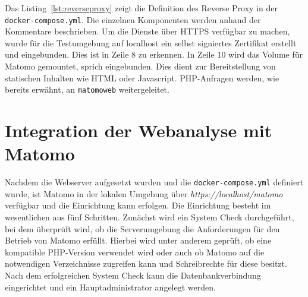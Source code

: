 Das Listing~\ref{lst:reverseproxy} zeigt die Definition des Reverse Proxy in der \texttt{docker-compose.yml}. Die einzelnen Komponenten werden anhand der Kommentare beschrieben. Um die Dienste über HTTPS verfügbar zu machen, wurde für die Testumgebung auf localhost ein selbst signiertes Zertifikat erstellt und eingebunden. Dies ist in Zeile 8 zu erkennen. In Zeile 10 wird das Volume für Matomo gemountet, sprich eingebunden. Dies dient zur Bereitstellung von statischen Inhalten wie HTML oder Javascript. PHP-Anfragen werden, wie bereits erwähnt, an \texttt{matomo\textunderscore web} weitergeleitet.

\section{Integration der Webanalyse mit Matomo}
Nachdem die Webserver aufgesetzt wurden und die \texttt{docker-compose.yml} definiert wurde, ist Matomo in der lokalen Umgebung über \textit{https://localhost/matomo} verfügbar und die Einrichtung kann erfolgen. Die Einrichtung besteht im wesentlichen aus fünf Schritten. Zunächst wird ein System Check durchgeführt, bei dem überprüft wird, ob die Serverumgebung die Anforderungen für den Betrieb von Matomo erfüllt. Hierbei wird unter anderem geprüft, ob eine kompatible PHP-Version verwendet wird oder auch ob Matomo auf die notwendigen Verzeichnisse zugreifen kann und Schreibrechte für diese besitzt. Nach dem erfolgreichen System Check kann die Datenbankverbindung eingerichtet und ein Hauptadministrator angelegt werden. 

